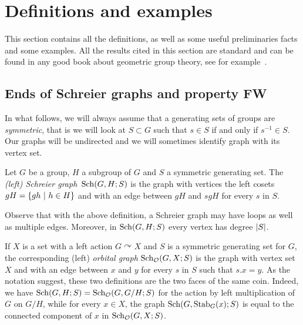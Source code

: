 %
%
%
%
%
%
%
%
%
%
\section{Definitions and examples}
This section contains all the definitions, as well as some useful preliminaries facts and some examples.
All the results cited in this section are standard and can be found in any good book about geometric group theory, see for example~\cite{}. 
%
%
%
%
%
%
%
%
%
%
\subsection{Ends of Schreier graphs and property FW}
\label{Subsection:FW}
%
%
%
%
%
In what follows, we will always assume that a generating sets of groups are \emph{symmetric}, that is we will look at $S\subset G$ such that $s\in S$ if and only if $s^{-1}\in S$.
Our graphs will be undirected and we will sometimes identify  graph with its vertex set.
%
%
\begin{defn}
Let $G$ be a group, $H$ a subgroup of $G$ and $S$ a symmetric generating set. The \emph{(left) Schreier graph} $\operatorname{Sch}(G,H;S)$ is the graph with vertices the left cosets $gH=\{gh\ |\ h\in H\}$ and with an edge between $gH$ and $sgH$ for every $s$ in $S$.
\end{defn}
%
%
Observe that with the above definition, a Schreier graph may have loops as well as multiple edges. Moreover, in $\operatorname{Sch}(G,H;S)$ every vertex has degree $\lvert S\rvert$.

If $X$ is a set with a left action $G\curvearrowright X$ and $S$ is a symmetric generating set for $G$, the corresponding (left) \emph{orbital graph} $\operatorname{Sch}_{\mathcal O}(G,X;S)$ is the graph with vertex set $X$ and with an edge between $x$ and $y$ for every $s$ in $S$ such that $s.x=y$.
As the notation suggest, these two definitions are the two faces of the same coin. Indeed, we have $\operatorname{Sch}(G,H;S)=\operatorname{Sch}_{\mathcal O}(G,G/H;S)$ for the  action by left multiplication of $G$ on $G/H$, while   for every $x\in X$, the graph $\operatorname{Sch}(G,\operatorname{Stab}_G(x);S)$ is equal to the connected component of $x$ in $\operatorname{Sch}_{\mathcal O}(G,X;S)$.

